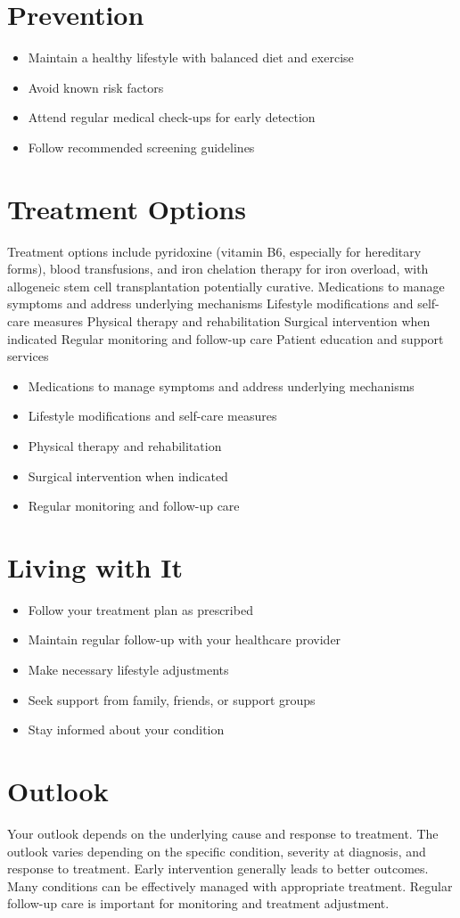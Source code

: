 \section{Prevention}
\begin{itemize}[noitemsep]
  \item Maintain a healthy lifestyle with balanced diet and exercise
  \item Avoid known risk factors
  \item Attend regular medical check-ups for early detection
  \item Follow recommended screening guidelines
\end{itemize}
\section{Treatment Options}
Treatment options include pyridoxine (vitamin B6, especially for hereditary forms), blood transfusions, and iron chelation therapy for iron overload, with allogeneic stem cell transplantation potentially curative. Medications to manage symptoms and address underlying mechanisms Lifestyle modifications and self-care measures Physical therapy and rehabilitation Surgical intervention when indicated Regular monitoring and follow-up care Patient education and support services

\begin{itemize}[noitemsep]
  \item Medications to manage symptoms and address underlying mechanisms
  \item Lifestyle modifications and self-care measures
  \item Physical therapy and rehabilitation
  \item Surgical intervention when indicated
  \item Regular monitoring and follow-up care
\end{itemize}
\section{Living with It}
\begin{itemize}[noitemsep]
  \item Follow your treatment plan as prescribed
  \item Maintain regular follow-up with your healthcare provider
  \item Make necessary lifestyle adjustments
  \item Seek support from family, friends, or support groups
  \item Stay informed about your condition
\end{itemize}
\section{Outlook}
Your outlook depends on the underlying cause and response to treatment. The outlook varies depending on the specific condition, severity at diagnosis, and response to treatment. Early intervention generally leads to better outcomes. Many conditions can be effectively managed with appropriate treatment. Regular follow-up care is important for monitoring and treatment adjustment.
